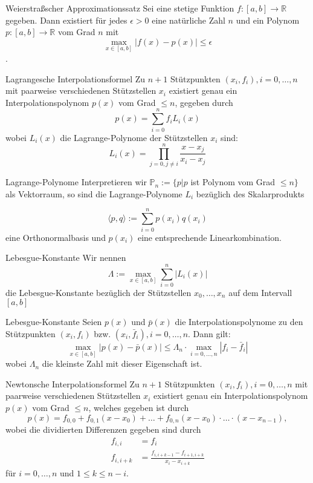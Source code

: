 \begin{flashcard}[Definition]{Weierstraßscher Approximationssatz}
Sei eine stetige Funktion $f: [a, b] \rightarrow \mathbb{R}$ gegeben.
Dann existiert für jedes $\epsilon > 0$ eine natürliche Zahl $n$ und ein Polynom
$p : [a, b] \rightarrow \mathbb{R}$ vom Grad $n$ mit
$$
	\max\limits_{x \in [a,b]} |f(x) - p(x)| \leq \epsilon
$$.
\end{flashcard}

\begin{flashcard}[Definition]{Lagrangesche Interpolationsformel}
Zu $n+1$ Stützpunkten $(x_i,f_i), i=0,\ldots,n$
mit paarweise verschiedenen Stützstellen $x_i$ existiert
genau ein Interpolationspolynom $p(x)$ vom Grad $\leq n$,  gegeben durch
$$
	p(x) = \sum_{i=0}^{n} f_i L_i(x)
$$
wobei $L_i(x)$ die Lagrange-Polynome der Stützstellen $x_i$ sind:
$$
	L_i(x) = \prod_{j=0, j \neq i}^{n} \frac{x-x_j}{x_i-x_j}
$$
\end{flashcard}

\begin{flashcard}[Bemerkung]{Lagrange-Polynome}
Interpretieren wir $\mathbb{P}_n := \lbrace p | p$ ist Polynom vom Grad $\leq n \rbrace$
als Vektorraum, so sind die Lagrange-Polynome $L_i$ bezüglich des Skalarprodukts

$$
	\langle p, q \rangle := \sum_{i=0}^{n} p(x_i) q(x_i)
$$
eine Orthonormalbasis und $p(x_i)$ eine entsprechende Linearkombination.
\end{flashcard}

\begin{flashcard}[Definition]{Lebesgue-Konstante}
Wir nennen
$$
	\Lambda := \max\limits_{x \in [a,b]} \sum_{i=0}^{n} |L_i(x)|
$$
die Lebesgue-Konstante bezüglich der Stützstellen $x_0,\ldots,x_n$ auf dem Intervall $[a,b]$
\end{flashcard}

\begin{flashcard}[Satz]{Lebesgue-Konstante}
Seien $p(x)$ und $\bar{p}(x)$ die Interpolationspolynome zu den Stützpunkten $(x_i, f_i)$
bzw. $(x_i, \bar{f}_i), i=0,\ldots,n$. Dann gilt:
$$
	\max\limits_{x \in [a,b]} |p(x) - \bar{p}(x)| \leq \Lambda_n \cdot \max\limits_{i=0,\ldots,n} |f_i - \bar{f}_i|
$$
wobei $\Lambda_n$ die kleinste Zahl mit dieser Eigenschaft ist.
\end{flashcard}

\begin{flashcard}[Satz]{Newtonsche Interpolationsformel}
Zu $n+1$ Stützpunkten $(x_i, f_i), i=0, \ldots , n$ mit paarweise verschiedenen Stützstellen $x_i$
existiert genau ein Interpolationspolynom $p(x)$ vom Grad $\leq n$, welches gegeben ist durch
$$
	p(x) = f_{0,0} + f_{0,1}(x-x_0) + \ldots + f_{0,n}(x-x_0) \cdot \ldots \cdot (x-x_{n-1}),
$$
wobei die dividierten Differenzen gegeben sind durch
{\begin{align*}
	f_{i,i} &= f_i\\
	f_{i,i+k} &= \frac{f_{i,i+k-1}-f_{i+1,i+k}}{x_i-x_{i+k}}
\end{align*}}
für $i=0, \ldots , n$ und $1 \leq k \leq n-i$.
\end{flashcard}

